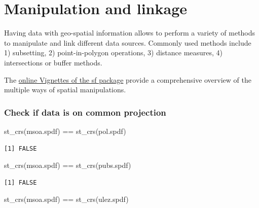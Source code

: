 \documentclass[
  letterpaper,
  DIV=11,
  numbers=noendperiod]{scrreprt}
\newenvironment{Shaded}{\begin{snugshade}}{\end{snugshade}}
\newcommand{\FunctionTok}[1]{\textcolor[rgb]{0.28,0.35,0.67}{#1}}
\newcommand{\NormalTok}[1]{\textcolor[rgb]{0.00,0.23,0.31}{#1}}
\newcommand{\SpecialCharTok}[1]{\textcolor[rgb]{0.37,0.37,0.37}{#1}}
\begin{document}
\hypertarget{manipulation-and-linkage}{%
\section{Manipulation and linkage}\label{manipulation-and-linkage}}

Having data with geo-spatial information allows to perform a variety of
methods to manipulate and link different data sources. Commonly used
methods include 1) subsetting, 2) point-in-polygon operations, 3)
distance measures, 4) intersections or buffer methods.

The \href{https://r-spatial.github.io/sf/articles/}{online Vignettes of
the sf package} provide a comprehensive overview of the multiple ways of
spatial manipulations.

\hypertarget{check-if-data-is-on-common-projection}{%
\subsubsection{Check if data is on common
projection}\label{check-if-data-is-on-common-projection}}

\begin{Shaded}
\begin{Highlighting}[]
\FunctionTok{st\_crs}\NormalTok{(msoa.spdf) }\SpecialCharTok{==} \FunctionTok{st\_crs}\NormalTok{(pol.spdf)}
\end{Highlighting}
\end{Shaded}

\begin{verbatim}
[1] FALSE
\end{verbatim}

\begin{Shaded}
\begin{Highlighting}[]
\FunctionTok{st\_crs}\NormalTok{(msoa.spdf) }\SpecialCharTok{==} \FunctionTok{st\_crs}\NormalTok{(pubs.spdf)}
\end{Highlighting}
\end{Shaded}

\begin{verbatim}
[1] FALSE
\end{verbatim}

\begin{Shaded}
\begin{Highlighting}[]
\FunctionTok{st\_crs}\NormalTok{(msoa.spdf) }\SpecialCharTok{==} \FunctionTok{st\_crs}\NormalTok{(ulez.spdf)}
\end{Highlighting}
\end{Shaded}
\end{document}
